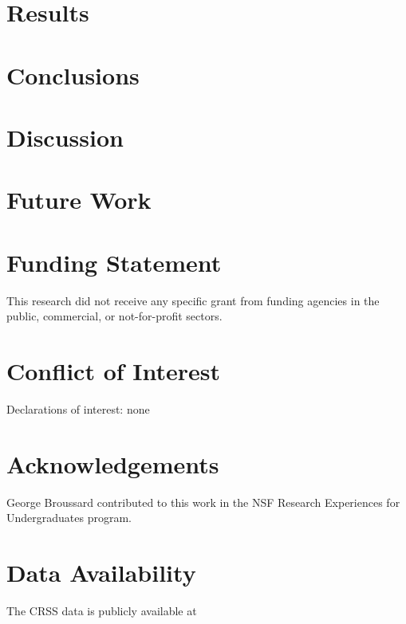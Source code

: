 \documentclass[fleqn]{cas-sc}
\begin{document}
\section{Results}\label{sec:Results}

\section{Conclusions}\label{Conclusions}

\section{Discussion}\label{Discussion}
%

\section{Future Work}\label{FutureWork}
%


\section*{Funding Statement}

This research did not receive any specific grant from funding agencies in the public, commercial, or not-for-profit sectors.

\section*{Conflict of Interest}

Declarations of interest: none

\section*{Acknowledgements}

George Broussard 
contributed to this work in the 
NSF Research Experiences for Undergraduates program.

\section*{Data Availability}

The CRSS data is publicly available at 
\end{document}

